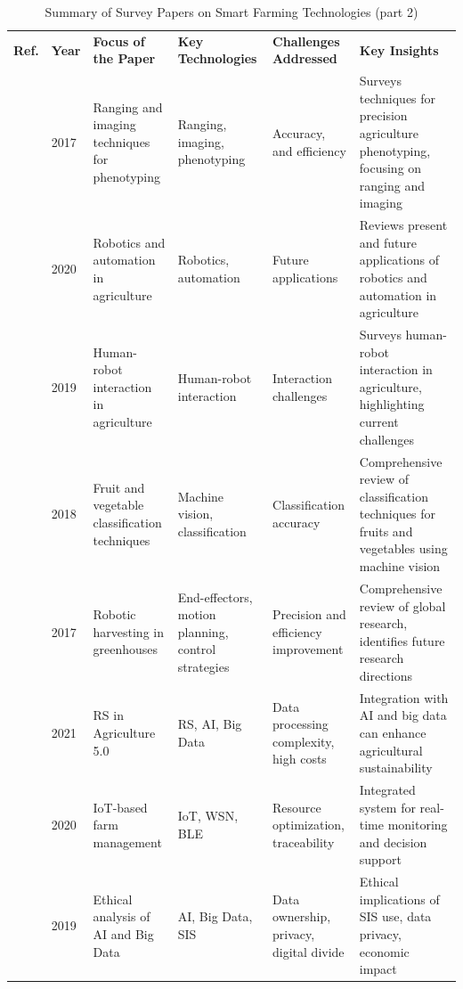 \documentclass[a4paper,fleqn]{cas-dc}
\begin{document}
\begin{table}[ht]
\scriptsize
\addtocounter{table}{-1}
\centering
\caption{Summary of Survey Papers on Smart Farming Technologies (part 2)} 
\begin{tabular} {p{0.4cm}p{0.5cm}p{3cm}p{3.2cm}p{3cm}p{5cm}}
\toprule
\textbf{Ref.} & \textbf{Year} & \textbf{Focus of the Paper} & \textbf{Key Technologies} & \textbf{Challenges Addressed} & \textbf{Key Insights} \\

\cite{narvaez2017survey} & 2017 & Ranging and imaging techniques for phenotyping & Ranging, imaging, phenotyping & Accuracy, and efficiency & Surveys techniques for precision agriculture phenotyping, focusing on ranging and imaging \\ \midrule
\cite{mahmud2020robotics} & 2020 & Robotics and automation in agriculture & Robotics, automation & Future applications & Reviews present and future applications of robotics and automation in agriculture \\ \midrule
\cite{vasconez2019human} & 2019 & Human-robot interaction in agriculture & Human-robot interaction & Interaction challenges & Surveys human-robot interaction in agriculture, highlighting current challenges \\ \midrule
\cite{hameed2018comprehensive} & 2018 & Fruit and vegetable classification techniques & Machine vision, classification & Classification accuracy & Comprehensive review of classification techniques for fruits and vegetables using machine vision \\ \midrule
\cite{liu2017research}& 2017 & Robotic harvesting in greenhouses & End-effectors, motion planning, control strategies & Precision and efficiency improvement & Comprehensive review of global research, identifies future research directions \\ \midrule
\cite{martos2021ensuring} & 2021 & RS in Agriculture 5.0 & RS, AI, Big Data & Data processing complexity, high costs & Integration with AI and big data can enhance agricultural sustainability \\ \midrule
\cite{visconti2020development} & 2020 & IoT-based farm management & IoT, WSN, BLE & Resource optimization, traceability & Integrated system for real-time monitoring and decision support \\ \midrule
\cite{mark2019ethics} & 2019 & Ethical analysis of AI and Big Data & AI, Big Data, SIS & Data ownership, privacy, digital divide & Ethical implications of SIS use, data privacy, economic impact \\ \midrule

\end{tabular}
\end{table}
\end{document}
